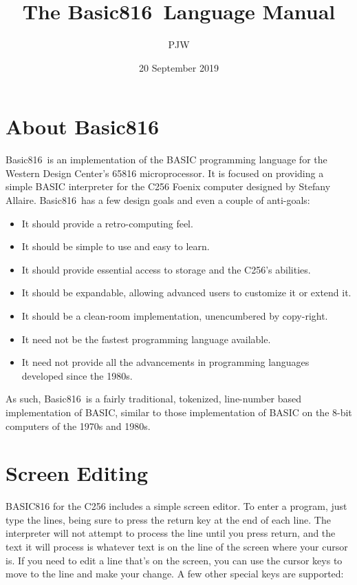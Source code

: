 \documentclass{report}
\begin{document}
    \newcommand{\BASIC}[0]{{\sc Basic816}}
    \newcommand{\keyword}[1]{{\tt {#1}}}
    \newcommand{\param}[1]{{\tt <{#1}>}}
    \title{The \BASIC\  Language Manual}
    \author{PJW}
    \date{20 September 2019}
    \maketitle

    \section*{About \BASIC}

    \BASIC\ is an implementation of the BASIC programming language for the Western Design Center's 65816 microprocessor.
    It is focused on providing a simple BASIC interpreter for the C256 Foenix computer designed by Stefany Allaire.
    \BASIC\ has a few design goals and even a couple of anti-goals:

    \begin{itemize}
        \item It should provide a retro-computing feel.
        \item It should be simple to use and easy to learn.
        \item It should provide essential access to storage and the C256's abilities.
        \item It should be expandable, allowing advanced users to customize it or extend it.
        \item It should be a clean-room implementation, unencumbered by copy-right. 
        \item It need not be the fastest programming language available.
        \item It need not provide all the advancements in programming languages developed since the 1980s.
    \end{itemize}

    As such, \BASIC\ is a fairly traditional, tokenized, line-number based implementation of BASIC, similar to those
    implementation of BASIC on the 8-bit computers of the 1970s and 1980s.

    \section*{Screen Editing}

    BASIC816 for the C256 includes a simple screen editor.
    To enter a program, just type the lines, being sure to press the return key at the end of each line.
    The interpreter will not attempt to process the line until you press return, and the text it will process
    is whatever text is on the line of the screen where your cursor is.
    If you need to edit a line that's on the screen, you can use the cursor keys to move to the line and make your change.
    A few other special keys are supported:
\end{document}
